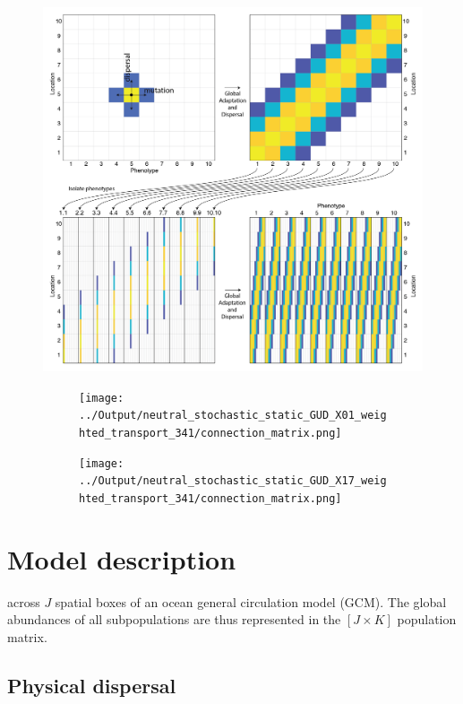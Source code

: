 \documentclass[12pt]{article}
\begin{document}
\begin{figure}[htp!]
\centering
\includegraphics[width=0.8\linewidth]{../Figures/Schematic.png}
\caption{}
\label{Schematic}
\end{figure}


\begin{figure}[htp!]
\begin{subfigure}{0.5\textwidth}
\texttt{[image: ../Output/neutral\_stochastic\_static\_GUD\_X01\_weighted\_transport\_341/connection\_matrix.png]}
\end{subfigure}
\begin{subfigure}{0.5\textwidth}
\texttt{[image: ../Output/neutral\_stochastic\_static\_GUD\_X17\_weighted\_transport\_341/connection\_matrix.png]}
\end{subfigure}
\caption{}
\label{Schematic}
\end{figure}



\section{Model description}





across $J$ spatial boxes of an ocean general circulation model (GCM). The global abundances of all subpopulations are thus represented in the $[J\times K]$ population matrix.



\subsection*{Physical dispersal}
\end{document}
